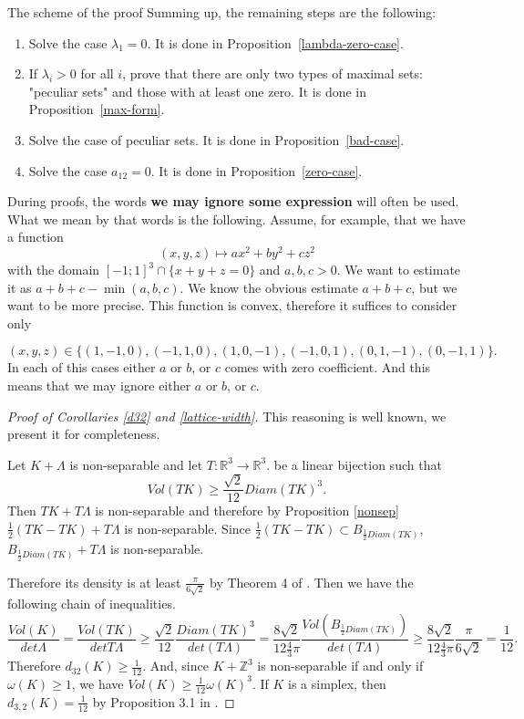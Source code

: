 \documentclass[12pt]{article}
\begin{document}
\begin{section}{The scheme of the proof}
Summing up, the remaining steps are the following:

\begin{enumerate}
    \item Solve the case $\lambda_{1}=0.$ It is done in Proposition~\ref{lambda-zero-case}.
    \item If $\lambda_{i}>0$ for all $i$, prove that there are only two types of maximal sets: "peculiar sets" and those with at least one zero. It is done in Proposition~\ref{max-form}. 
    \item Solve the case of peculiar sets. It is done in Proposition~\ref{bad-case}.
    \item Solve the case  $a_{12}=0$. It is done in Proposition~\ref{zero-case}.
    
\end{enumerate}


    During proofs, the words \textbf{we may ignore some  expression} will often be used. What we mean by that words is the following. Assume, for example, that we have a function $$(x,y,z)\mapsto ax^2 + by^2 + cz^2$$ with the domain $[-1;1]^{3}\cap \{x+y+z=0\}$ and $a,b,c > 0$. We want to estimate it as $a+b+c - \min(a,b,c).$ We know the obvious estimate $a+b+c$, but we want to be more precise. This function is convex, therefore it suffices to consider only 
    
    $$(x,y,z)\in \{(1,-1,0),(-1,1,0),(1,0,-1),(-1,0,1),(0,1,-1), (0,-1,1)\}.$$  
    In each of this cases either $a$ or $b$, or $c$ comes with zero coefficient. And this means that we may ignore either $a$ or $b$, or $c$. 


    \begin{proof}[Proof of Corollaries \ref{d32} and \ref{lattice-width}]
        This reasoning is well known, we present it for completeness. 

        
        Let $K + \Lambda$ is non-separable and let $T:\mathbb{R}^3\to \mathbb{R}^3.$ be a linear bijection such that $$Vol(TK)\geq \frac{\sqrt{2}}{12}Diam(TK)^3.$$
        Then $TK + T\Lambda$ is non-separable and therefore by Proposition \ref{nonsep} $\frac{1}{2}(TK-TK) + T\Lambda$ is non-separable. Since $\frac{1}{2}(TK-TK)\subset B_{\frac{1}{2}Diam(TK)}$, $B_{\frac{1}{2}Diam(TK)} + T\Lambda$ is non-separable.
        
        Therefore its density is at least $\frac{\pi}{6\sqrt{2}}$ by Theorem 4 of \cite{makai1978}. Then we have the following chain of inequalities.
        $$
            \frac{Vol(K)}{det \Lambda} = \frac{Vol(TK)}{det T\Lambda} \geq \frac{\sqrt{2}}{12}\frac{Diam(TK)^3}{det (T\Lambda)} = \frac{8\sqrt{2}}{12\frac{4}{3}\pi}\frac{Vol(B_{\frac{1}{2}Diam(TK)})}{det (T\Lambda)} \geq \frac{8\sqrt{2}}{12\frac{4}{3}\pi}\frac{\pi}{6\sqrt{2}} = \frac{1}{12}.
        $$
        Therefore $d_{32}(K)\geq \frac{1}{12}.$ And, since $K+\mathbb{Z}^3$ is non-separable if and only if $\omega(K)\geq 1$, we have  $Vol(K)\geq \frac{1}{12}\omega(K)^3.$  If $K$ is a simplex, then  $d_{3,2}(K) = \frac{1}{12}$ by Proposition 3.1 in \cite{makai2016}.
        

\end{proof}
\end{section}
\end{document}
